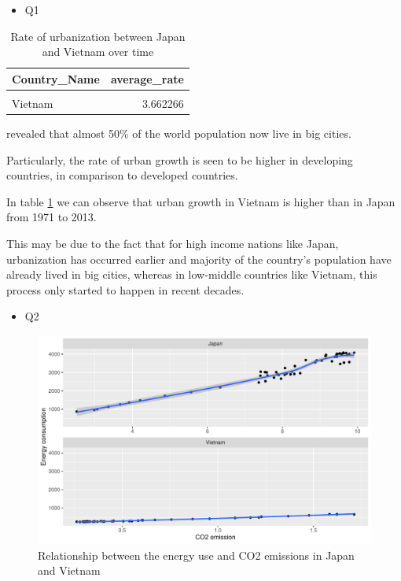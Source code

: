 \documentclass[11pt,a4paper,]{article}
\providecommand{\tightlist}{%
  \setlength{\itemsep}{0pt}\setlength{\parskip}{0pt}}
\begin{document}
\begin{itemize}
\tightlist
\item
  Q1
\end{itemize}

\begin{table}[!h]

\caption{\label{tab:urban}Rate of urbanization between Japan and Vietnam over time}
\centering
\begin{tabular}[t]{lr}
\toprule
Country\_Name & average\_rate\\
\midrule
\cellcolor{gray!6}{Japan} & \cellcolor{gray!6}{0.979718}\\
Vietnam & 3.662266\\
\bottomrule
\end{tabular}
\end{table}

\textcite{8809066} revealed that almost 50\% of the world population now live in big cities.

Particularly, the rate of urban growth is seen to be higher in developing countries, in comparison to developed countries.

In table \ref{tab:urban} we can observe that urban growth in Vietnam is higher than in Japan from 1971 to 2013.

This may be due to the fact that for high income nations like Japan, urbanization has occurred earlier and majority of the country's population have already lived in big cities, whereas in low-middle countries like Vietnam, this process only started to happen in recent decades.

\begin{itemize}
\tightlist
\item
  Q2
\end{itemize}

\begin{figure}

{\centering \includegraphics[width=0.7\linewidth]{Figures/CO2emissions-1} 

}

\caption{Relationship between the energy use and CO2 emissions in Japan and Vietnam}\label{fig:CO2emissions}
\end{figure}
\end{document}
